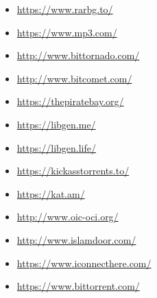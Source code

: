 \begin{multicols}{2}
\begin{itemize}
    \item \url{https://www.rarbg.to/}
    \item \url{https://www.mp3.com/}
    \item \url{http://www.bittornado.com/}
    \item \url{http://www.bitcomet.com/}
    \item \url{https://thepiratebay.org/}
    \item \url{https://libgen.me/}
    \item \url{https://libgen.life/}
    \item \url{https://kickasstorrents.to/}
    \item \url{https://kat.am/}
    \item \url{http://www.oic-oci.org/}
    \item \url{http://www.islamdoor.com/}
    \item \url{https://www.iconnecthere.com/}
    \item \url{https://www.bittorrent.com/}


\end{itemize}
\end{multicols}

